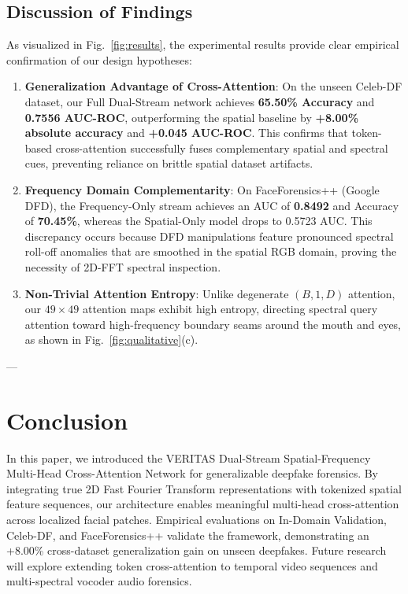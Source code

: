 \documentclass[journal,10pt,twocolumn]{article}
\begin{document}
\subsection{Discussion of Findings}
As visualized in Fig.~\ref{fig:results}, the experimental results provide clear empirical confirmation of our design hypotheses:

\begin{enumerate}
    \item \textbf{Generalization Advantage of Cross-Attention}:
    On the unseen Celeb-DF dataset, our Full Dual-Stream network achieves \textbf{65.50\% Accuracy} and \textbf{0.7556 AUC-ROC}, outperforming the spatial baseline by \textbf{+8.00\% absolute accuracy} and \textbf{+0.045 AUC-ROC}. This confirms that token-based cross-attention successfully fuses complementary spatial and spectral cues, preventing reliance on brittle spatial dataset artifacts.
    \item \textbf{Frequency Domain Complementarity}:
    On FaceForensics++ (Google DFD), the Frequency-Only stream achieves an AUC of \textbf{0.8492} and Accuracy of \textbf{70.45\%}, whereas the Spatial-Only model drops to 0.5723 AUC. This discrepancy occurs because DFD manipulations feature pronounced spectral roll-off anomalies that are smoothed in the spatial RGB domain, proving the necessity of 2D-FFT spectral inspection.
    \item \textbf{Non-Trivial Attention Entropy}:
    Unlike degenerate $(B, 1, D)$ attention, our $49 \times 49$ attention maps exhibit high entropy, directing spectral query attention toward high-frequency boundary seams around the mouth and eyes, as shown in Fig.~\ref{fig:qualitative}(c).
\end{enumerate}

---

\section{Conclusion}
\label{sec:conclusion}

In this paper, we introduced the VERITAS Dual-Stream Spatial-Frequency Multi-Head Cross-Attention Network for generalizable deepfake forensics. By integrating true 2D Fast Fourier Transform representations with tokenized spatial feature sequences, our architecture enables meaningful multi-head cross-attention across localized facial patches. Empirical evaluations on In-Domain Validation, Celeb-DF, and FaceForensics++ validate the framework, demonstrating an +8.00\% cross-dataset generalization gain on unseen deepfakes. Future research will explore extending token cross-attention to temporal video sequences and multi-spectral vocoder audio forensics.



\end{document}
